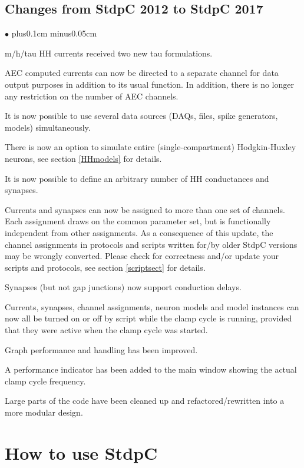 \documentclass{article}
\newenvironment{myitem}{\begin{list}{$\bullet$}{\setlength{\leftmargin}{1.1em}
\itemsep0.1cm plus0.1cm minus0.05cm
\listparindent0cm
\addtolength{\labelsep}{0.5\labelsep}
\setlength{\labelwidth}{0.8em}
\setlength{\leftmargin}{\labelwidth}
\addtolength{\leftmargin}{\labelsep}
}}{\end{list}}
\begin{document}
\subsection{Changes from StdpC 2012 to StdpC 2017}
\begin{myitem}
\item m/h/tau HH currents received two new tau formulations.
\item AEC computed currents can now be directed to a separate channel for data output
 purposes in addition to its usual function. In addition, there is no longer any restriction
 on the number of AEC channels.
\item It is now possible to use several data sources (DAQs, files, spike generators, models) simultaneously.
\item There is now an option to simulate entire (single-compartment) Hodgkin-Huxley neurons, see
 section \ref{HHmodels} for details.
\item It is now possible to define an arbitrary number of HH conductances and synapses.
\item Currents and synapses can now be assigned to more than one set of channels.
 Each assignment draws on the common parameter set, but is functionally independent
 from other assignments. As a consequence of this update, the channel assignments
 in protocols and scripts written for/by older StdpC versions may be wrongly converted.
 Please check for correctness and/or update your scripts and protocols, see section \ref{scriptsect} for details.
\item Synapses (but not gap junctions) now support conduction delays.
\item Currents, synapses, channel assignments, neuron models and model instances can now all be
 turned on or off by script while the clamp cycle is running, provided that they were active when
 the clamp cycle was started.
\item Graph performance and handling has been improved.
\item A performance indicator has been added to the main window showing the actual clamp cycle
frequency.
\item Large parts of the code have been cleaned up and refactored/rewritten into a more modular design.
\end{myitem}

\section{How to use StdpC}
\end{document}
